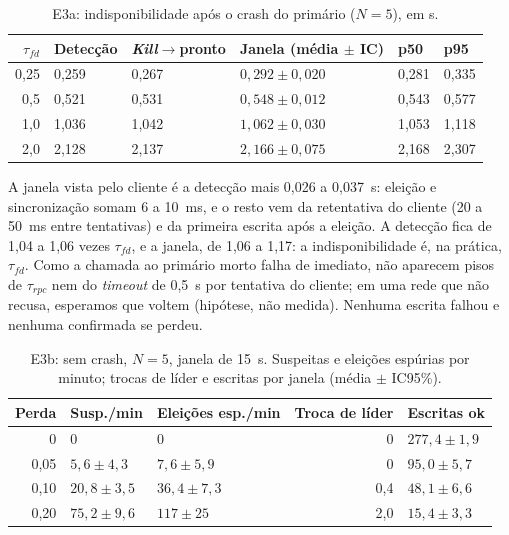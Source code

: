 \documentclass[conference,a4paper]{IEEEtran}
\begin{document}
\begin{table}[!ht]
\caption{E3a: indisponibilidade após o crash do primário ($N=5$), em s.}
\label{tab:e3a}
\centering
\footnotesize
\setlength{\tabcolsep}{3pt}
\begin{tabular}{@{}rlllll@{}}
\toprule
$\tau_{fd}$ & Detecção & \emph{Kill}$\to$pronto & Janela (média $\pm$ IC) & p50 & p95 \\
\midrule
0,25 & 0,259 & 0,267 & $0{,}292\pm0{,}020$ & 0,281 & 0,335 \\
0,5 & 0,521 & 0,531 & $0{,}548\pm0{,}012$ & 0,543 & 0,577 \\
1,0 & 1,036 & 1,042 & $1{,}062\pm0{,}030$ & 1,053 & 1,118 \\
2,0 & 2,128 & 2,137 & $2{,}166\pm0{,}075$ & 2,168 & 2,307 \\
\bottomrule
\end{tabular}
\end{table}

A janela vista pelo cliente é a detecção mais 0,026 a 0,037~s: eleição e
sincronização somam 6 a 10~ms, e o resto vem da retentativa do cliente (20 a
50~ms entre tentativas) e da primeira escrita após a eleição. A detecção fica
de 1,04 a 1,06 vezes $\tau_{fd}$, e a janela, de 1,06 a 1,17: a
indisponibilidade é, na prática, $\tau_{fd}$. Como a chamada ao primário morto falha de imediato, não
aparecem pisos de $\tau_{rpc}$ nem do \emph{timeout} de 0,5~s por tentativa do
cliente; em uma rede que não recusa, esperamos que voltem (hipótese, não
medida). Nenhuma escrita falhou e nenhuma confirmada se perdeu.

\begin{table}[!ht]
\caption{E3b: sem crash, $N=5$, janela de 15~s. Suspeitas e eleições espúrias por minuto; trocas de líder e escritas por janela (média $\pm$ IC95\%).}
\label{tab:e3b}
\centering
\footnotesize
\setlength{\tabcolsep}{3pt}
\begin{tabular}{@{}rllrl@{}}
\toprule
Perda & Susp./min & Eleições esp./min & Troca de líder & Escritas ok \\
\midrule
0 & 0 & 0 & 0 & $277{,}4\pm1{,}9$ \\
0,05 & $5{,}6\pm4{,}3$ & $7{,}6\pm5{,}9$ & 0 & $95{,}0\pm5{,}7$ \\
0,10 & $20{,}8\pm3{,}5$ & $36{,}4\pm7{,}3$ & 0,4 & $48{,}1\pm6{,}6$ \\
0,20 & $75{,}2\pm9{,}6$ & $117\pm25$ & 2,0 & $15{,}4\pm3{,}3$ \\
\bottomrule
\end{tabular}
\end{table}
\end{document}
